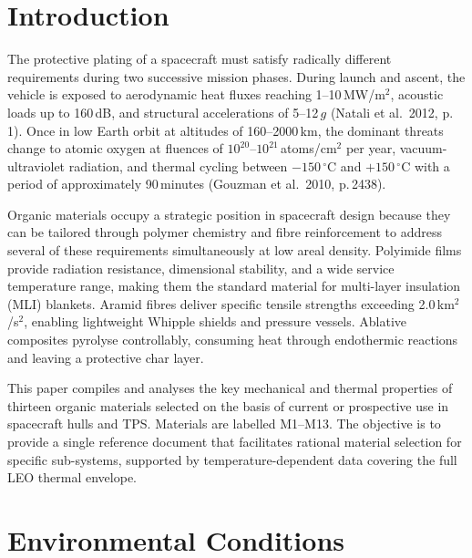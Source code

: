 \documentclass[11pt,a4paper]{article}
\begin{document}
\vspace{10pt}

\section*{Introduction}

The protective plating of a spacecraft must satisfy radically different
requirements during two successive mission phases. During launch and ascent, the
vehicle is exposed to aerodynamic heat fluxes reaching 1--10\,MW/m$^{2}$,
acoustic loads up to 160\,dB, and structural accelerations of 5--12\,$g$
(Natali et al.\ 2012, p.\,1). Once in low Earth orbit at altitudes of 160--2000\,km,
the dominant threats change to atomic oxygen at fluences of
$10^{20}$--$10^{21}$\,atoms/cm$^{2}$ per year, vacuum-ultraviolet radiation, and
thermal cycling between $-150\,^{\circ}$C and $+150\,^{\circ}$C with a period
of approximately 90\,minutes (Gouzman et al.\ 2010, p.\,2438).

Organic materials occupy a strategic position in spacecraft design because
they can be tailored through polymer chemistry and fibre reinforcement to address
several of these requirements simultaneously at low areal density. Polyimide films
provide radiation resistance, dimensional stability, and a wide service
temperature range, making them the standard material for multi-layer insulation
(MLI) blankets. Aramid fibres deliver specific tensile strengths exceeding
2.0\,km$^{2}$/s$^{2}$, enabling lightweight Whipple shields and pressure vessels.
Ablative composites pyrolyse controllably, consuming heat through endothermic
reactions and leaving a protective char layer.

This paper compiles and analyses the key mechanical and thermal properties of
thirteen organic materials selected on the basis of current or prospective use in
spacecraft hulls and TPS. Materials are labelled M1--M13. The objective is to
provide a single reference document that facilitates rational material selection
for specific sub-systems, supported by temperature-dependent data covering the
full LEO thermal envelope.

\section*{Environmental Conditions}
\end{document}
